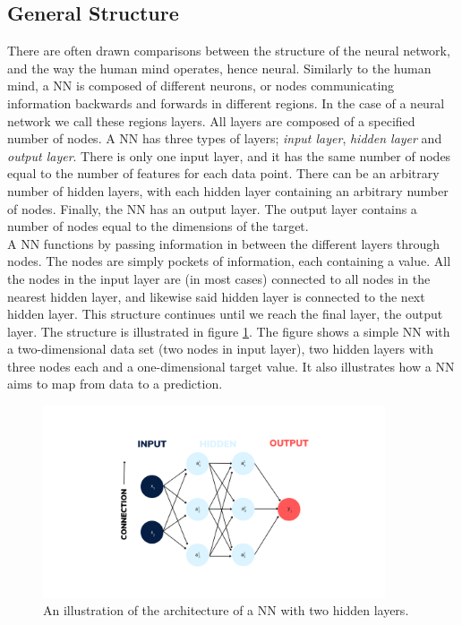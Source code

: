\subsection{General Structure}
There are often drawn comparisons between the structure of the neural network, 
and the way the human mind operates, hence neural. Similarly to the human mind, a \ac{NN} is 
composed of different neurons, or nodes communicating information backwards and forwards in different 
regions. In the case of a neural network we call these regions layers. All layers
are composed of a specified number of nodes. A \ac{NN} has three types of layers;
\emph{input layer}, \emph{hidden layer} and \emph{output layer}. There is only one input layer, and it has
the same number of nodes equal to the number of features for each data point. 
There can be an arbitrary number of hidden layers, with each hidden layer containing
an arbitrary number of nodes. Finally, the \ac{NN} has an output layer. The output layer
contains a number of nodes equal to the dimensions of the target.
\\
A \ac{NN} functions by passing information in between the different layers through 
nodes. The nodes are simply pockets of information, each containing a value. 
All the nodes in the input layer are (in most cases) connected to all nodes in the nearest hidden layer,
and likewise said hidden layer is connected to the next hidden layer. This structure continues
until we reach the final layer, the output layer. The structure is illustrated in figure
\ref{fig:NN}. The figure shows a simple \ac{NN} with a two-dimensional data set (two nodes in input layer),
two hidden layers with three nodes each and a one-dimensional target value. It also illustrates 
how a \ac{NN} aims to map from data to a prediction.
\begin{figure}
    \centering
    \vspace*{-12.5mm} 
    \includegraphics[width=0.9\textwidth]{Figures/Illustrations/Input_labels.png}
    \vspace*{-12.5mm} 
    \caption{An illustration of the architecture of a \acs{NN} with two hidden layers.}
    \label{fig:NN}
\end{figure}

